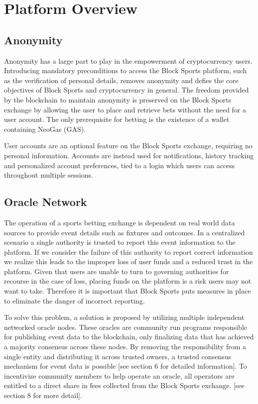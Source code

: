 \documentclass{article}
\begin{document}
\section{Platform Overview}

	\subsection{Anonymity}
Anonymity has a large part to play in the empowerment of cryptocurrency users. Introducing mandatory preconditions to access the Block Sports platform, such as the verification of personal details, removes anonymity and defies the core objectives of Block Sports and cryptocurrency in general. The freedom provided by the blockchain to maintain anonymity is preserved on the Block Sports exchange by allowing the user to place and retrieve bets without the need for a user account. The only prerequisite for betting is the existence of a wallet containing NeoGas (GAS). 

User accounts are an optional feature on the Block Sports exchange, requiring no personal information. Accounts are instead used for notifications, history tracking and personalized account preferences, tied to a login which users can access throughout multiple sessions.

	\subsection{Oracle Network}	
The operation of a sports betting exchange is dependent on real world data sources to provide event details such as fixtures and outcomes. In a centralized scenario a single authority is trusted to report this event information to the platform. If we consider the failure of this authority to report correct information we realize this leads to the improper loss of user funds and a reduced trust in the platform. Given that users are unable to turn to governing authorities for recourse in the case of loss, placing funds on the platform is a risk users may not want to take. Therefore it is important that Block Sports puts measures in place to eliminate the danger of incorrect reporting.

To solve this problem, a solution is proposed by utilizing multiple independent networked oracle nodes. These oracles are community run programs responsible for publishing event data to the blockchain, only finalizing data that has achieved a majority consensus across these nodes. By removing the responsibility from a single entity and distributing it across trusted owners, a trusted consensus mechanism for event data is possible [see section 6 for detailed information]. To incentivize community members to help operate an oracle, all operators are entitled to a direct share in fees collected from the Block Sports exchange. [see section 8 for more detail].
\end{document}
